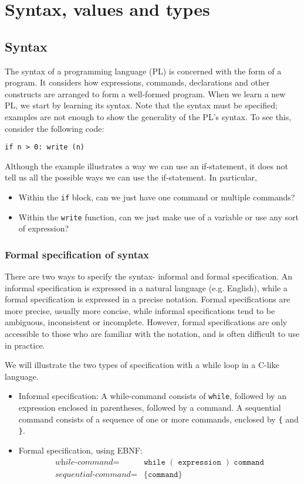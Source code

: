 \documentclass[a4paper, openany]{memoir}
\begin{document}
\chapter{Syntax, values and types}
\section{Syntax}
The syntax of a programming language (PL) is concerned with the form of a program. It considers how expressions, commands, declarations and other constructs are arranged to form a well-formed program. When we learn a new PL, we start by learning its syntax. Note that the syntax must be specified; examples are not enough to show the generality of the PL's syntax. To see this, consider the following code:
\begin{verbatim}
if n > 0: write (n)
\end{verbatim}
Although the example illustrates a way we can use an if-statement, it does not tell us all the possible ways we can use the if-statement. In particular,
\begin{itemize}
    \item Within the \texttt{if} block, can we just have one command or multiple commands?
    \item Within the \texttt{write} function, can we just make use of a variable or use any sort of expression?
\end{itemize}

\subsection{Formal specification of syntax}
There are two ways to specify the syntax- informal and formal specification. An informal specification is expressed in a natural language (e.g. English), while a formal specification is expressed in a precise notation. Formal specifications are more precise, usually more concise, while informal specifications tend to be ambiguous, inconsistent or incomplete. However, formal specifications are only accessible to those who are familiar with the notation, and is often difficult to use in practice.

We will illustrate the two types of specification with a while loop in a C-like language.
\begin{itemize}
    \item Informal specification: A while-command consists of \texttt{while}, followed by an expression enclosed in parentheses, followed by a command. A sequential command consists of a sequence of one or more commands, enclosed by \texttt{\{} and \texttt{\}}.
    \item Formal specification, using EBNF:
    \begin{align*}
        \textit{while-command} =& \texttt{while }  ( \texttt{ expression } )  \texttt{ command} \\
        \textit{sequential-command} =& \{ \texttt{command} \}
    \end{align*}
\end{itemize}
\end{document}
